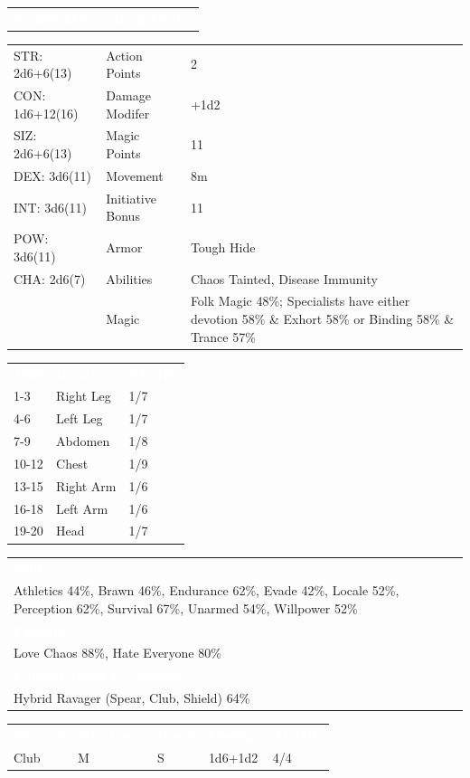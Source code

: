 \documentclass[letterpaper,serif]{rpg-module}
\begin{document}
\noindent\begin{tabularx}{\linewidth}{X}
\rowcolor{gray}
\textcolor{white}{\textbf{Roman Davis - Drug Dealer}}
\end{tabularx}
\begin{tabularx}{\linewidth}{XXX}
STR: 2d6+6(13) & Action Points & 2 \\
CON: 1d6+12(16) & Damage Modifer & +1d2 \\
SIZ: 2d6+6(13) & Magic Points & 11 \\
DEX: 3d6(11) & Movement & 8m \\
INT: 3d6(11) & Initiative Bonus & 11 \\
POW: 3d6(11) & Armor & Tough Hide \\
CHA: 2d6(7) & Abilities & Chaos Tainted, Disease Immunity \\
    & Magic & Folk Magic 48\%; Specialists have either devotion 58\% \& Exhort 58\% or Binding 58\% \& Trance 57\%
\end{tabularx}
\begin{tabularx}{\linewidth}{XXX}
\rowcolor{gray}
\textcolor{white}{\textbf{1d20}} & \textcolor{white}{\textbf{Location}} & \textcolor{white}{\textbf{AP/HP}} \\
1-3 & Right Leg & 1/7 \\
4-6 & Left Leg & 1/7 \\
7-9 & Abdomen & 1/8 \\
10-12 & Chest & 1/9 \\
13-15 & Right Arm & 1/6 \\
16-18 & Left Arm & 1/6 \\
19-20 & Head & 1/7 
\end{tabularx}
\begin{tabularx}{\linewidth}{X}
\rowcolor{gray}
\textcolor{white}{\textbf{Skills}} \\
Athletics 44\%, Brawn 46\%, Endurance 62\%, Evade 42\%, Locale 52\%, Perception 62\%, Survival 67\%, Unarmed 54\%, Willpower 52\%\\
\rowcolor{gray}
\textcolor{white}{\textbf{Passions}} \\
Love Chaos 88\%, Hate Everyone 80\% \\
\rowcolor{gray}
\textcolor{white}{\textbf{Combat Styles \& Weapons}} \\
Hybrid Ravager (Spear, Club, Shield) 64\%
\end{tabularx}
\begin{tabularx}{\linewidth}{XXXXX}
\rowcolor{gray}
\textcolor{white}{\textbf{Weapon}} & \textcolor{white}{\textbf{Size/Force}} & \textcolor{white}{\textbf{Reach}} & \textcolor{white}{\textbf{Damage}} & \textcolor{white}{\textbf{AP/HP}} \\
Club & M & S & 1d6+1d2 & 4/4
\end{tabularx}
\end{document}

